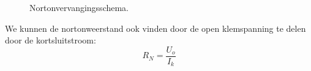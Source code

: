 \begin{figure}[!ht]
\centering
{}
\caption{Nortonvervangingsschema.}
\label{fig:gelnortonvervangingsschema}
\end{figure}

We kunnen de nortonweerstand ook vinden door de open klemspanning te delen door de kortsluitstroom:
%
\begin{equation}
R_N = \dfrac{U_o}{I_k}
\end{equation}




